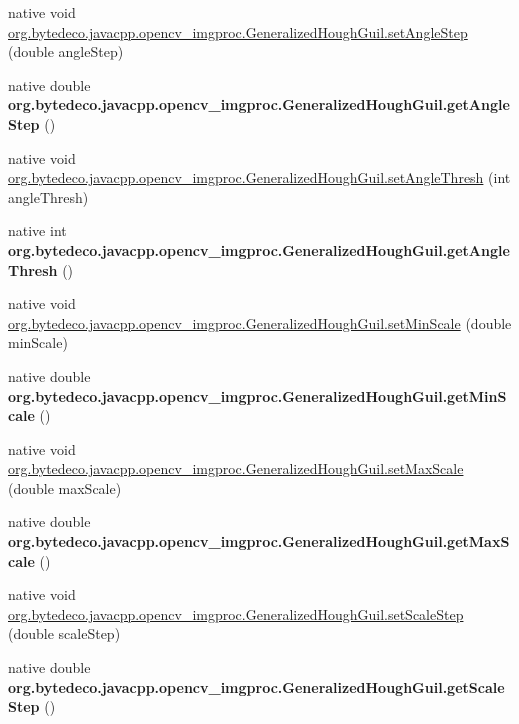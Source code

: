 \begin{DoxyCompactItemize}
\item 
native void \hyperlink{group__imgproc_ga68165aad724a0130724caaa5cbe49aeb}{org.\+bytedeco.\+javacpp.\+opencv\+\_\+imgproc.\+Generalized\+Hough\+Guil.\+set\+Angle\+Step} (double angle\+Step)
\item 
\mbox{\label{group__imgproc_ga23c3c73353e26dde8de0d812da80786d}} 
native double {\bfseries org.\+bytedeco.\+javacpp.\+opencv\+\_\+imgproc.\+Generalized\+Hough\+Guil.\+get\+Angle\+Step} ()
\item 
native void \hyperlink{group__imgproc_gaeba2e2313c8d860e626dd7225d07fca3}{org.\+bytedeco.\+javacpp.\+opencv\+\_\+imgproc.\+Generalized\+Hough\+Guil.\+set\+Angle\+Thresh} (int angle\+Thresh)
\item 
\mbox{\label{group__imgproc_ga758fdf8e8ca2e6cea9e7c204a6fddcb7}} 
native int {\bfseries org.\+bytedeco.\+javacpp.\+opencv\+\_\+imgproc.\+Generalized\+Hough\+Guil.\+get\+Angle\+Thresh} ()
\item 
native void \hyperlink{group__imgproc_gac43dc1513a83e1b7e0744411e0df313b}{org.\+bytedeco.\+javacpp.\+opencv\+\_\+imgproc.\+Generalized\+Hough\+Guil.\+set\+Min\+Scale} (double min\+Scale)
\item 
\mbox{\label{group__imgproc_ga09143d2b79f42e218b4e1b65a2fb2b79}} 
native double {\bfseries org.\+bytedeco.\+javacpp.\+opencv\+\_\+imgproc.\+Generalized\+Hough\+Guil.\+get\+Min\+Scale} ()
\item 
native void \hyperlink{group__imgproc_ga742c12ee154e98bd98c81edc1abada8c}{org.\+bytedeco.\+javacpp.\+opencv\+\_\+imgproc.\+Generalized\+Hough\+Guil.\+set\+Max\+Scale} (double max\+Scale)
\item 
\mbox{\label{group__imgproc_gae26bf72d694940401d80938465306605}} 
native double {\bfseries org.\+bytedeco.\+javacpp.\+opencv\+\_\+imgproc.\+Generalized\+Hough\+Guil.\+get\+Max\+Scale} ()
\item 
native void \hyperlink{group__imgproc_gae75f4f7f0497b548ae4b9443c241f1d8}{org.\+bytedeco.\+javacpp.\+opencv\+\_\+imgproc.\+Generalized\+Hough\+Guil.\+set\+Scale\+Step} (double scale\+Step)
\item 
\mbox{\label{group__imgproc_gafced1775943ca7260dd847c8a27511fc}} 
native double {\bfseries org.\+bytedeco.\+javacpp.\+opencv\+\_\+imgproc.\+Generalized\+Hough\+Guil.\+get\+Scale\+Step} ()

\end{DoxyCompactItemize}
